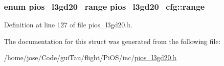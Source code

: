 \hypertarget{structpios__l3gd20__cfg_acc8d8efddd5b48a7febd54c5a4c5cb4b}{
\subsubsection[{range}]{\setlength{\rightskip}{0pt plus 5cm}enum {\bf pios\-\_\-l3gd20\-\_\-range} pios\-\_\-l3gd20\-\_\-cfg\-::range}}\label{structpios__l3gd20__cfg_acc8d8efddd5b48a7febd54c5a4c5cb4b}


Definition at line 127 of file pios\-\_\-l3gd20.\-h.



The documentation for this struct was generated from the following file\-:\begin{DoxyCompactItemize}
\item 
/home/jose/\-Code/gui\-Tau/flight/\-Pi\-O\-S/inc/\hyperlink{pios__l3gd20_8h}{pios\-\_\-l3gd20.\-h}\end{DoxyCompactItemize}
